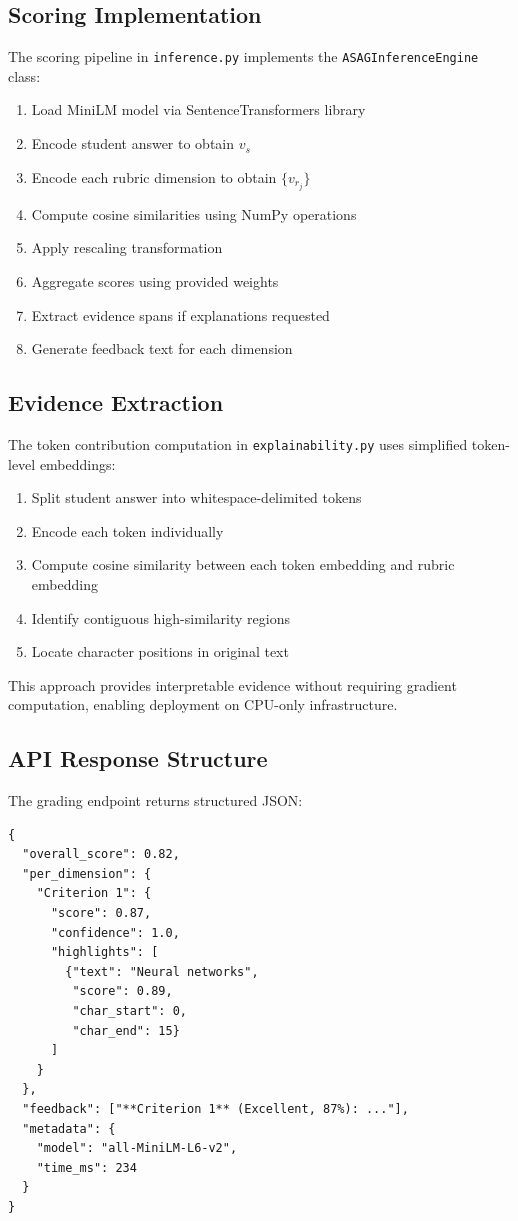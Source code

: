 \documentclass[conference]{IEEEtran}
\begin{document}
\subsection{Scoring Implementation}
The scoring pipeline in \texttt{inference.py} implements the \texttt{ASAGInferenceEngine} class:
\begin{enumerate}
    \item Load MiniLM model via SentenceTransformers library
    \item Encode student answer to obtain $v_s$
    \item Encode each rubric dimension to obtain $\{v_{r_j}\}$
    \item Compute cosine similarities using NumPy operations
    \item Apply rescaling transformation
    \item Aggregate scores using provided weights
    \item Extract evidence spans if explanations requested
    \item Generate feedback text for each dimension
\end{enumerate}

\subsection{Evidence Extraction}
The token contribution computation in \texttt{explainability.py} uses simplified token-level embeddings:
\begin{enumerate}
    \item Split student answer into whitespace-delimited tokens
    \item Encode each token individually
    \item Compute cosine similarity between each token embedding and rubric embedding
    \item Identify contiguous high-similarity regions
    \item Locate character positions in original text
\end{enumerate}

This approach provides interpretable evidence without requiring gradient computation, enabling deployment on CPU-only infrastructure.

\subsection{API Response Structure}
The grading endpoint returns structured JSON:
\begin{lstlisting}[basicstyle=\small\ttfamily]
{
  "overall_score": 0.82,
  "per_dimension": {
    "Criterion 1": {
      "score": 0.87,
      "confidence": 1.0,
      "highlights": [
        {"text": "Neural networks",
         "score": 0.89,
         "char_start": 0,
         "char_end": 15}
      ]
    }
  },
  "feedback": ["**Criterion 1** (Excellent, 87%): ..."],
  "metadata": {
    "model": "all-MiniLM-L6-v2",
    "time_ms": 234
  }
}
\end{lstlisting}
\end{document}
